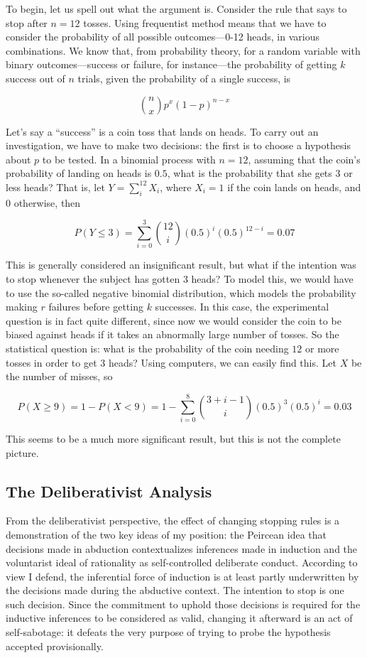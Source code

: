 To begin, let us spell out what the argument is. Consider the rule that says to stop after \(n=12\) tosses. Using frequentist method means that we have to consider the probability of all
possible outcomes---0-12 heads, in various combinations.  We know that, from probability theory, for a random
variable with binary outcomes---success or failure, for instance---the
probability of getting \(k\) success out of \(n\) trials, given the
probability of a single success, is

\[{n \choose x} p^x (1-p)^{n-x}\]

Let's say a ``success'' is a coin toss that lands on heads. To carry out
an investigation, we have to make two decisions: the first is to choose
a hypothesis about \(p\) to be tested. In a binomial process with
\(n=12\), assuming that the coin's probability of landing on heads is
\(0.5\), what is the probability that she gets 3 or less heads? That is,
let \(Y=\sum_i^{12} X_i\), where \(X_i = 1\) if the coin lands on heads,
and 0 otherwise, then

\[P(Y \leq 3 ) =  \sum_{i=0}^{3} {12 \choose i} (0.5)^i (0.5)^{12-i} = 0.07\]

This is generally considered an insignificant result, but what if the
intention was to stop whenever the subject has gotten 3 heads? To model
this, we would have to use the so-called negative binomial distribution,
which models the probability making \(r\) failures before getting \(k\)
successes. In this case, the experimental question is in fact quite
different, since now we would consider the coin to be biased against
heads if it takes an abnormally large number of tosses. So the
statistical question is: what is the probability of the coin needing
\(12\) or more tosses in order to get 3 heads? Using computers, we can
easily find this. Let \(X\) be the number of misses, so

\[P(X \geq 9) = 1 - P(X <9) = 1 - \sum_{i=0}^{8} {3+i-1 \choose i} (0.5)^3 (0.5)^{i} =0.03\]

This seems to be a much more significant result, but this is not the
complete picture. 

\subsection{The Deliberativist Analysis}

From the deliberativist perspective, the effect of changing stopping rules is a demonstration of the two key ideas of my position: the Peircean idea that decisions made in abduction contextualizes inferences made in induction and the voluntarist ideal of rationality as self-controlled deliberate conduct. According to view I defend, the inferential force of induction is at least partly underwritten by the decisions made during the abductive context. The intention to stop is one such decision. Since the commitment to uphold those decisions is required for the inductive inferences to be considered as valid, changing it afterward is an act of self-sabotage: it defeats the very purpose of trying to probe the hypothesis accepted provisionally. 


